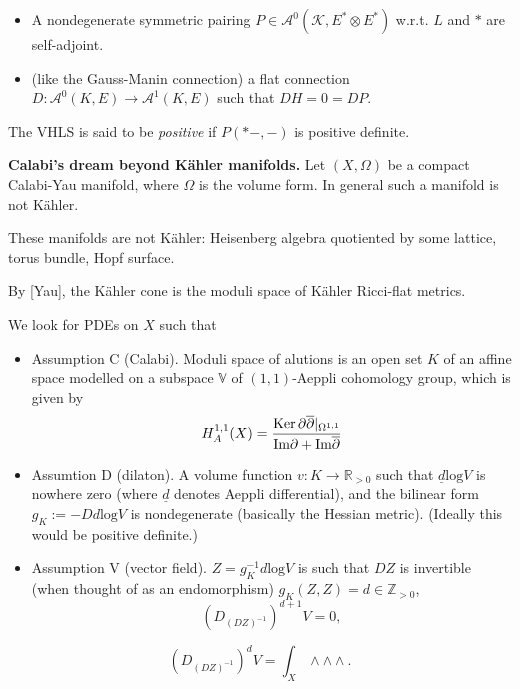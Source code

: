 {\begin{definition}
\begin{itemize}
\item A nondegenerate symmetric pairing
$P \in \mathcal{A}^0(\mathcal{K},E^* \otimes E^*)$
w.r.t. $L$ and $*$ are self-adjoint.

\item (like the Gauss-Manin connection)
a flat connection $D: \mathcal{A}^0(K,E)\to\mathcal{A}^1(K,E)$
such that $DH=0=DP$.
\end{itemize}
The VHLS is said to be {\it positive} if $P(*-,-)$ 
is positive definite.
\end{definition}

\noindent
{\bf Calabi's dream beyond Kähler manifolds.}
Let $(X,\Omega)$ be a compact Calabi-Yau manifold,
where $\Omega$ is the volume form.
In general such a manifold is not Kähler.

\begin{example}
\label{example-non-kahler}
These manifolds are not Kähler:
Heisenberg algebra quotiented by some lattice,
torus bundle, Hopf surface.
\end{example}

\noindent
By [Yau], the Kähler cone is the moduli
space of Kähler Ricci-flat metrics.

We look for PDEs on  $X$ such that
\begin{itemize}
\item Assumption C (Calabi). Moduli
space of alutions is an open set $K$ 
of an affine space modelled on
a subspace $\mathbb{V}$ of
$(1,1)$-Aeppli cohomology group,
which is given by
$$
H^{1,1}_A(X)=\frac{\mathop{\mathrm{Ker}} \partial\overline{\partial}|_{\Omega^{1,1}}}
{\text{Im} \partial+\text{Im}\overline{\partial}}
$$

\item Assumtion D (dilaton).
A volume function $v:K\to \mathbb{R}_{>0}$
such that $\underline{d}\text{log} V$ 
is nowhere zero (where $\underline{d}$ denotes
Aeppli differential), and the bilinear form
$g_K:=-Dd \text{log}V$
is nondegenerate (basically the Hessian metric).
(Ideally this would be positive definite.)

\item Assumption V (vector field).
$Z=g_K^{-1}d \text{log}V$
is such that $DZ$ is invertible
(when thought of as an endomorphism)
$g_K(Z,Z)=d \in \mathbb{Z}_{>0}$,
 $$
(D_{(DZ)^{-1}})^{d+1}V=0,
$$
\end{itemize}

\begin{remark}
\label{remark-pairing}
$$
(D_{(DZ)^{-1}})^dV=\int_X \wedge \wedge \wedge.
$$
\end{remark}

}
